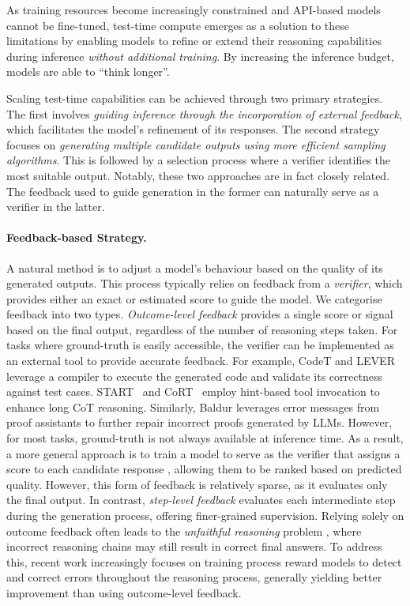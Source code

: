 \documentclass[]{selfevolagent}
\theoremstyle{plain}
\theoremstyle{definition}
\theoremstyle{remark}
\begin{document}
As training resources become increasingly constrained and API-based models cannot be fine-tuned, test-time compute emerges as a solution to these limitations by enabling models to refine or extend their reasoning capabilities during inference \textit{without additional training}. By increasing the inference budget, models are able to ``think longer''. 

Scaling test-time capabilities can be achieved through two primary strategies. The first involves \textit{guiding inference through the incorporation of external feedback}, which facilitates the model's refinement of its responses. The second strategy focuses on \textit{generating multiple candidate outputs using more efficient sampling algorithms}. This is followed by a selection process where a verifier identifies the most suitable output. Notably, these two approaches are in fact closely related. The feedback used to guide generation in the former can naturally serve as a verifier in the latter.

\paragraph{{Feedback-based Strategy.}} A natural method is to adjust a model's behaviour based on the quality of its generated outputs. This process typically relies on feedback from a \textit{verifier}, which provides either an exact or estimated score to guide the model. We categorise feedback into two types. \textit{Outcome-level feedback} provides a single score or signal based on the final output, regardless of the number of reasoning steps taken. For tasks where ground-truth is easily accessible, the verifier can be implemented as an external tool to provide accurate feedback. For example, CodeT \citep{ChenZNZLLC23} and LEVER \citep{ni2023lever} leverage a compiler to execute the generated code and validate its correctness against test cases. START~\citep{li2025start} and CoRT~\citep{li2025cort} employ hint-based tool invocation to enhance long CoT reasoning. Similarly, Baldur \citep{first2023baldur} leverages error messages from proof assistants to further repair incorrect proofs generated by LLMs. However, for most tasks, ground-truth is not always available at inference time. As a result, a more general approach is to train a model to serve as the verifier that assigns a score to each candidate response \citep{liu2024skyworkrewardbagtricksreward, liu2025skyworkrewardv2scalingpreferencedata}, allowing them to be ranked based on predicted quality. However, this form of feedback is relatively sparse, as it evaluates only the final output. In contrast, \textit{step-level feedback} evaluates each intermediate step during the generation process, offering finer-grained supervision. Relying solely on outcome feedback often leads to the \textit{unfaithful reasoning} problem \citep{turpin2023language}, where incorrect reasoning chains may still result in correct final answers. To address this, recent work \citep{wang-etal-2024-math, jiao-etal-2024-learning, setlur2025rewarding} increasingly focuses on training process reward models to detect and correct errors throughout the reasoning process, generally yielding better improvement than using outcome-level feedback.
\end{document}
